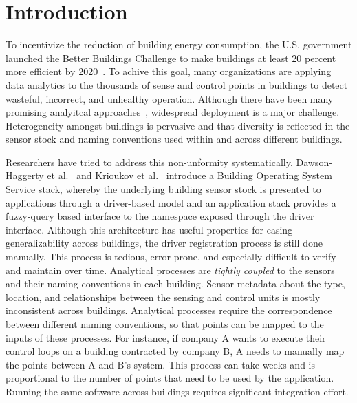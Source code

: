 \section{Introduction}

To incentivize the reduction of building energy consumption, the U.S. government 
launched the Better Buildings Challenge to make buildings at least 20 percent 
more efficient by 2020~\cite{doe2013better}. To achive this goal, many organizations 
are applying data analytics to the thousands of sense and control points in 
buildings to detect wasteful, incorrect, and unhealthy operation.  
Although there have been many promising analyitcal approaches~\cite{}, widespread deployment is a 
major challenge.  Heterogeneity amongst buildings is pervasive and that diversity is reflected
in the sensor stock and naming conventions used within and across different buildings.

Researchers have tried to address this non-unformity systematically.
Dawson-Haggerty et al.~\cite{boss} and Krioukov et al.~\cite{bas}
introduce a Building Operating System Service stack, whereby
the underlying building sensor stock is presented to applications through a driver-based model and 
an application stack 
provides a fuzzy-query based interface to the namespace exposed through the driver interface.
Although this architecture has useful properties  for easing generalizability across
buildings, the driver registration process is still done manually. This process is tedious, error-prone, 
and especially difficult to verify and maintain over time.  
Analytical processes are \emph{tightly coupled} to the sensors and their naming conventions in each building. 
Sensor metadata about the type, location, and relationships between the sensing 
and control units is mostly inconsistent across buildings.
Analytical processes require the correspondence between different naming 
conventions, so that points can be mapped to the inputs of these processes.
For instance, if company A wants to execute their 
control loops on a building contracted by company B, A needs to manually 
map the points between A and B's system. This process can take weeks and is proportional 
to the number of points that need to be used by the application. Running the same software across 
buildings requires significant integration effort.



